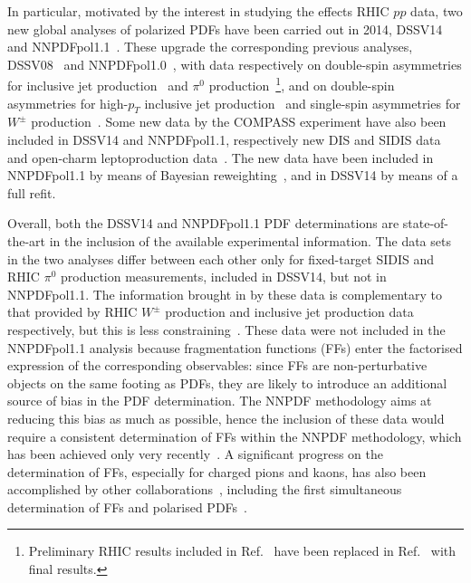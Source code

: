 In particular, motivated by the interest in studying the effects RHIC $pp$ 
data, two new global analyses of polarized PDFs have been carried out in
2014, DSSV14~\cite{deFlorian:2014yva} and NNPDFpol1.1~\cite{Nocera:2014gqa}.
%
These upgrade the corresponding previous analyses, 
DSSV08~\cite{deFlorian:2008mr} and 
NNPDFpol1.0~\cite{Ball:2013lla}, with data respectively on double-spin 
asymmetries for inclusive jet production~\cite{Adamczyk:2014ozi} 
and $\pi^0$ production~\cite{Adare:2014hsq}\footnote{Preliminary RHIC results 
included in Ref.~\cite{deFlorian:2008mr} have been replaced in
Ref.~\cite{deFlorian:2014yva} with final results.}, 
and on double-spin asymmetries for high-$p_T$ inclusive jet 
production~\cite{Adamczyk:2014ozi,Adamczyk:2012qj,Adare:2010cc} and single-spin
asymmetries for $W^\pm$ production~\cite{Adamczyk:2014xyw}.
%
Some new data by the COMPASS experiment have also been included in 
DSSV14 and NNPDFpol1.1, respectively new DIS and SIDIS 
data~\cite{Alekseev:2010hc,Alekseev:2010ub} and open-charm leptoproduction 
data~\cite{Adolph:2012ca}. 
%
The new data have been included in NNPDFpol1.1 
by means of Bayesian reweighting~\cite{Ball:2010gb},
and in DSSV14 by means of a full refit.  

Overall, both the DSSV14 and NNPDFpol1.1 PDF determinations are 
state-of-the-art in the inclusion of the available experimental information. 
%
The data sets in the two analyses differ between each other only for 
fixed-target SIDIS and RHIC $\pi^0$ production measurements, included in 
DSSV14, but not in NNPDFpol1.1. 
%
The information brought in by these data is complementary to that provided by 
RHIC $W^\pm$ production and inclusive jet production data respectively, 
but this is less constraining~\cite{Nocera:2014gqa}. 
%
These data were not included in the NNPDFpol1.1 analysis because 
fragmentation functions (FFs) enter the factorised expression of the 
corresponding observables: since FFs are non-perturbative objects on the 
same footing as PDFs, they are likely to introduce an additional source of 
bias in the PDF determination. 
%
The NNPDF methodology aims at reducing this bias as much as possible, hence 
the inclusion of these data would require a consistent determination 
of FFs within the NNPDF methodology, which has been achieved only very 
recently~\cite{Nocera:2017qgb,Bertone:2017xsf}. 
%
A significant progress on the determination of FFs, especially for charged
pions and kaons, has also been accomplished by other 
collaborations~\cite{deFlorian:2014xna,deFlorian:2017lwf,Hirai:2016loo,
Sato:2016tuz}, including the first simultaneous determination of FFs and 
polarised PDFs~\cite{Ethier:2017zbq}.


